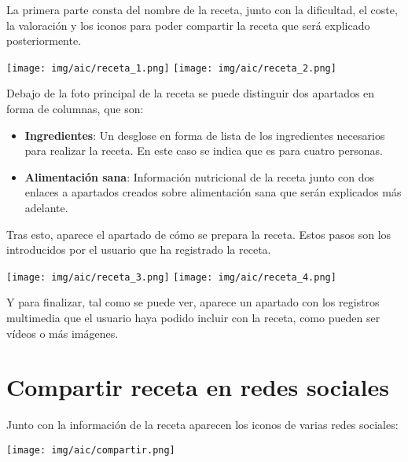 \documentclass{\ClassPath/viu-tfm-template}
\begin{document}
La primera parte consta del nombre de la receta, junto con la dificultad, el coste, la valoración y los iconos para poder compartir la receta que será explicado posteriormente.


\begin{center}
    \vspace{-10pt}
    \texttt{[image: img/aic/receta\_1.png]}
    \texttt{[image: img/aic/receta\_2.png]}
    \vspace{-20pt}
\end{center}

Debajo de la foto principal de la receta se puede distinguir dos apartados en forma de columnas, que son:

\vspace{-1em}
\begin{itemize}
    \item \textbf{Ingredientes}: Un desglose en forma de lista de los ingredientes necesarios para realizar la receta. En este caso se indica que es para cuatro personas.
    \item \textbf{Alimentación sana}: Información nutricional de la receta junto con dos enlaces a apartados creados sobre alimentación sana que serán explicados más adelante.
\end{itemize}

Tras esto, aparece el apartado de cómo se prepara la receta. Estos pasos son los introducidos por el usuario que ha registrado la receta.


\begin{center}
    \vspace{-10pt}
    \texttt{[image: img/aic/receta\_3.png]}
    \texttt{[image: img/aic/receta\_4.png]}
    \vspace{-20pt}
\end{center}

Y para finalizar, tal como se puede ver, aparece un apartado con los registros multimedia que el usuario haya podido incluir con la receta, como pueden ser vídeos o más imágenes.


\section{Compartir receta en redes sociales}

Junto con la información de la receta aparecen los iconos de varias redes sociales:

\begin{center}
    \vspace{-10pt}
    \texttt{[image: img/aic/compartir.png]}
    \vspace{-20pt}
\end{center}
\end{document}
